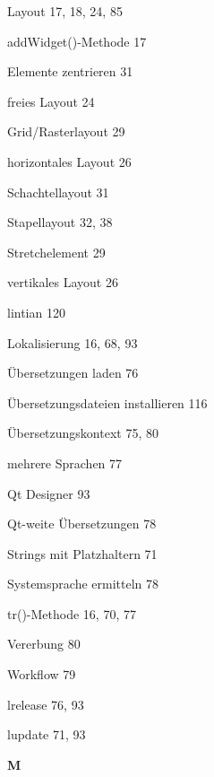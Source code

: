 \documentclass{book}
\renewcommand\indexspace{\vspace{11pt}}
\renewcommand\subitem{\par}
\begin{document}
\begin{multicols}{2}
\begin{osp-index}
  \item Layout\hspace{1mm} 17, 18, 24, 85
    \subitem addWidget()-Methode\hspace{1mm} 17
    \subitem Elemente zentrieren\hspace{1mm} 31
    \subitem freies Layout\hspace{1mm} 24
    \subitem Grid/Rasterlayout\hspace{1mm} 29
    \subitem horizontales Layout\hspace{1mm} 26
    \subitem Schachtellayout\hspace{1mm} 31
    \subitem Stapellayout\hspace{1mm} 32, 38
    \subitem Stretchelement\hspace{1mm} 29
    \subitem vertikales Layout\hspace{1mm} 26
  \item lintian\hspace{1mm} 120
  \item Lokalisierung\hspace{1mm} 16, 68, 93
    \subitem \"Ubersetzungen laden\hspace{1mm} 76
    \subitem \"Ubersetzungsdateien installieren\hspace{1mm} 116
    \subitem \"Ubersetzungskontext\hspace{1mm} 75, 80
    \subitem mehrere Sprachen\hspace{1mm} 77
    \subitem Qt Designer\hspace{1mm} 93
    \subitem Qt-weite \"Ubersetzungen\hspace{1mm} 78
    \subitem Strings mit Platzhaltern\hspace{1mm} 71
    \subitem Systemsprache ermitteln\hspace{1mm} 78
    \subitem tr()-Methode\hspace{1mm} 16, 70, 77
    \subitem Vererbung\hspace{1mm} 80
    \subitem Workflow\hspace{1mm} 79
  \item lrelease\hspace{1mm} 76, 93
  \item lupdate\hspace{1mm} 71, 93

  \indexspace
{\sffamily\bfseries M}\nopagebreak


\end{osp-index}
\end{multicols}
\end{document}
